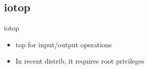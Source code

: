 \subsection{iotop}

\begin{frame}[fragile]{iotop}
  \begin{itemize}
    \pause \item top for input/output operations
    \pause \item In recent distrib, it requires root privileges
  \end{itemize}
\end{frame}
